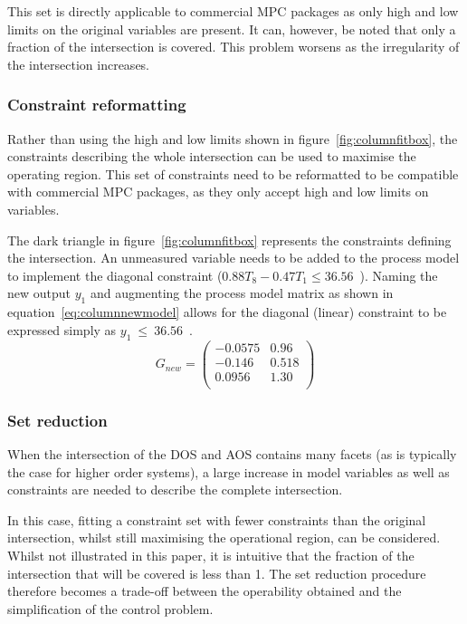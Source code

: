 \documentclass[final,authoryear,5pt,times,twocolumn]{elsarticle}
\newcommand{\bpm}{\begin{pmatrix}} %
\newcommand{\epm}{\end{pmatrix}}
\begin{document}
This set is directly applicable to commercial MPC packages as only high and low limits on the original variables are present.
It can, however, be noted that only a fraction of the intersection is covered.
This problem worsens as the irregularity of the intersection increases.

\subsubsection{Constraint reformatting}
Rather than using the high and low limits shown in figure~\ref{fig:columnfitbox}, the constraints describing the whole intersection can be used to maximise the operating region.
This set of constraints need to be reformatted to be compatible with commercial MPC packages, as they only accept high and low limits on variables.

The dark triangle in figure~\ref{fig:columnfitbox} represents the constraints defining the intersection.
An unmeasured variable needs to be added to the process model to implement the diagonal constraint ($0.88T_8-0.47T_1\leq 36.56$~\textcelsius).
Naming the new output $y_1$ and augmenting the process model matrix as shown in equation~\ref{eq:columnnewmodel} allows for the diagonal (linear) constraint to be expressed simply as {$y_1~\leq~36.56$~\textcelsius}.
\begin{equation}
  \label{eq:columnnewmodel}
  G_{new}= \bpm -0.0575 & 0.96 \\       %
                  -0.146  & 0.518 \\      %
                   0.0956 & 1.30 \\ \epm  %
\end{equation}

\subsubsection{Set reduction}
When the intersection of the DOS and AOS contains many facets (as is typically the case for higher order systems), a large increase in model variables as well as constraints are needed to describe the complete intersection.

In this case, fitting a constraint set with fewer constraints than the original intersection, whilst still maximising the operational region, can be considered.
Whilst not illustrated in this paper, it is intuitive that the fraction of the intersection that will be covered is less than 1.
The set reduction procedure therefore becomes a trade-off between the operability obtained and the simplification of the control problem.
\end{document}
